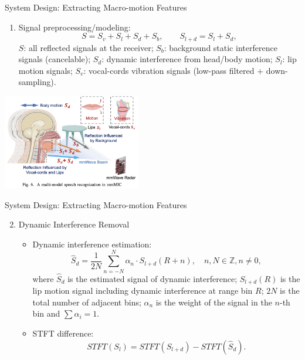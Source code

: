 \documentclass[dvipsnames, handout]{beamer}
\newcommand{\1}{\mathds{1}}	%
\begin{document}
\begin{frame}[t]{System Design: Extracting Macro-motion Features}

\begin{enumerate}
\item Signal preprocessing/modeling: 
$$S = S_v + S_l + S_d + S_b, \qquad S_{l+d} = S_l + S_d,$$
$S$: all reflected signals at the receiver; $S_b$: background static interference signals (cancelable); $S_d$: dynamic interference from head/body motion;   $S_l$: lip motion signals; $S_v$: vocal-cords vibration signals (low-pass filtered + down-sampling). 
\end{enumerate}

\begin{center}
\includegraphics[width=0.45\textwidth]{imgs/mmmic-fig6.png}
\end{center}

\end{frame}

\begin{frame}[t]{System Design: Extracting Macro-motion Features}

\begin{enumerate}
\setcounter{enumi}{1}
\item Dynamic Interference Removal
\begin{itemize}
\item Dynamic interference estimation:
$$\hat{S}_d = \frac{1}{2N}\sum^N_{n=-N} \alpha_n \cdot S_{l+d}(R+n), \quad n, N\in \mathbb{Z}, n\ne 0,$$
where $\hat{S}_d$ is the estimated signal of dynamic interference; $S_{l+d}(R)$ is the lip motion signal including dynamic interference at range bin $R$; $2N$ is the total number of adjacent bins; $\alpha_n$ is the weight of the signal in the $n$-th bin and $\sum \alpha_i = 1$. 
\item STFT difference:
$$STFT(S_l) = STFT(S_{l+d}) - STFT(\hat{S}_d).$$
\end{itemize}
\end{enumerate}

\end{frame}
\end{document}
